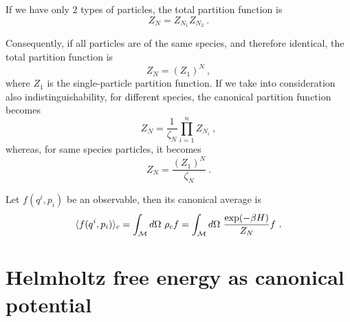     \begin{example}
        If we have only $2$ types of particles, the total partition function is 
        \begin{equation*}
            Z_N = Z_{N_1} Z_{N_2} ~.
        \end{equation*}
    \end{example}
    Consequently, if all particles are of the same species, and therefore identical, the total partition function is 
    \begin{equation}\label{c:zdist}
        Z_N = (Z_1)^N ~,
    \end{equation}
    where $Z_1$ is the single-particle partition function. 
    If we take into consideration also indistinguishability, for different species, the canonical partition function becomes 
    \begin{equation*}
        Z_N = \frac{1}{\zeta_N} \prod_{i=1}^{n} Z_{N_i} ~,
    \end{equation*}
    whereas, for same species particles, it becomes
    \begin{equation*}
        Z_N = \frac{(Z_1)^N}{\zeta_N} ~.
    \end{equation*}
    
    Let $f(q^i, p_i)$ be an observable, then its canonical average is 
    \begin{equation}\label{c:av}
        \langle f(q^i, p_i)\rangle_{c} = \int_{\mathcal M} d\Omega ~ \rho_{c} f = \int_{\mathcal M} d\Omega ~ \frac{\exp (-\beta H)}{Z_N} f ~.
    \end{equation}

\section{Helmholtz free energy as canonical potential}


